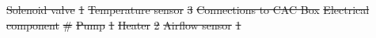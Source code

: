 \documentclass[a4paper,12pt,twoside]{article}
\providecommand{\DIFdeltex}[1]{{\protect\color{red}\sout{#1}}}                      %
\providecommand{\DIFdelFL}[1]{\DIFdel{#1}} %
\providecommand{\DIFdel}[1]{\texorpdfstring{\DIFdeltex{#1}}{}} %
\begin{document}
\DIFdelFL{Solenoid valve                            }%
\DIFdelFL{1                       }%
\DIFdelFL{Temperature sensor                        }%
\DIFdelFL{3                       }%
{%
\DIFdelFL{Connections to CAC Box}}
\DIFdelFL{Electrical component }%
\DIFdelFL{\# }%
\DIFdelFL{Pump                  }%
\DIFdelFL{1  }%
\DIFdelFL{Heater                }%
\DIFdelFL{2  }%
\DIFdelFL{Airflow sensor        }%
\DIFdelFL{1  }%
\end{document}
